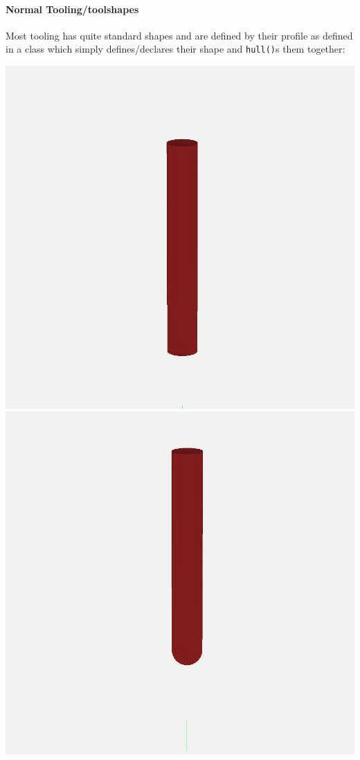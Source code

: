 \documentclass{ltxdoc}
\begin{document}
\begin{samepage}
\paragraph{Normal Tooling/toolshapes}

\label{para:normaltooling} Most tooling has quite standard shapes 
and are defined by their profile as defined in a class which simply defines/declares their shape and \verb|hull()|s them together:

  \noindent\includegraphics[width=\linewidth/3]{images/tool_square_201.png}%
           \includegraphics[width=\linewidth/3]{images/tool_ball_202.png}%

\end{samepage}
\end{document}

